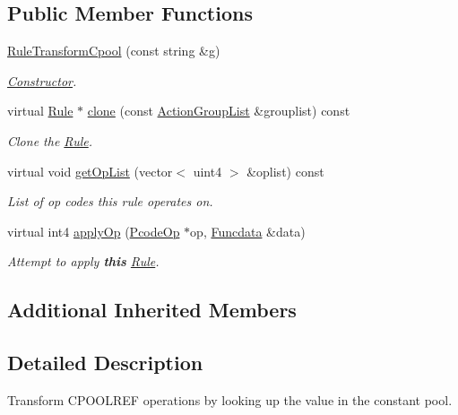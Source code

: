 \subsection*{Public Member Functions}
\begin{DoxyCompactItemize}
\item 
\mbox{\hyperlink{class_rule_transform_cpool_a6180ea4f84c2837b508c13584cd9040a}{Rule\+Transform\+Cpool}} (const string \&g)
\begin{DoxyCompactList}\small\item\em \mbox{\hyperlink{class_constructor}{Constructor}}. \end{DoxyCompactList}\item 
virtual \mbox{\hyperlink{class_rule}{Rule}} $\ast$ \mbox{\hyperlink{class_rule_transform_cpool_a0221ad873217f4dbad2e59e5ef37e23e}{clone}} (const \mbox{\hyperlink{class_action_group_list}{Action\+Group\+List}} \&grouplist) const
\begin{DoxyCompactList}\small\item\em Clone the \mbox{\hyperlink{class_rule}{Rule}}. \end{DoxyCompactList}\item 
virtual void \mbox{\hyperlink{class_rule_transform_cpool_ab979cb5eb69370d2fbdc014578d1a958}{get\+Op\+List}} (vector$<$ uint4 $>$ \&oplist) const
\begin{DoxyCompactList}\small\item\em List of op codes this rule operates on. \end{DoxyCompactList}\item 
virtual int4 \mbox{\hyperlink{class_rule_transform_cpool_af499e077d284de28aa52a807b53152de}{apply\+Op}} (\mbox{\hyperlink{class_pcode_op}{Pcode\+Op}} $\ast$op, \mbox{\hyperlink{class_funcdata}{Funcdata}} \&data)
\begin{DoxyCompactList}\small\item\em Attempt to apply {\bfseries{this}} \mbox{\hyperlink{class_rule}{Rule}}. \end{DoxyCompactList}\end{DoxyCompactItemize}
\subsection*{Additional Inherited Members}


\subsection{Detailed Description}
Transform C\+P\+O\+O\+L\+R\+EF operations by looking up the value in the constant pool. 

